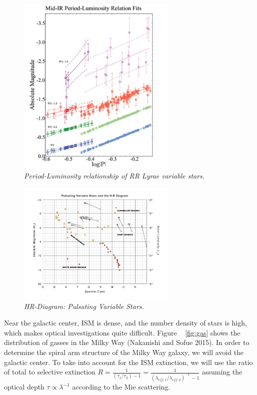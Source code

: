 \documentclass[letterpaper,11pt]{article}
\begin{document}
\begin{figure}[htb!]
  \begin{center}
\centerline{\includegraphics[width=3in]{figures/PL_relation}}
\caption{\it \small{Period-Luminosity relationship of RR Lyrae variable stars. \label{fig:plrelationrrlyrae}}}
  \end{center}
\end{figure}
\begin{figure}[htb!]
  \begin{center}
\centerline{\includegraphics[width=3in]{figures/var_star_HR.png}}
\caption{\it \small{HR-Diagram: Pulsating Variable Stars. \label{fig:var-star-hr}}}
  \end{center}
\end{figure}


Near the galactic center, ISM is dense, and the number density of stars is high, which makes optical investigations quite difficult. Figure ~ \ref{fig:gas} shows the distribution of gasses in the Milky Way (Nakanishi and Sofue 2015). In order to determine the spiral arm structure of the Milky Way galaxy, we will avoid the galactic center. To take into account for the ISM extinction, we will use the ratio of total to selective extinction $R = \frac{1}{(\tau_{1} / \tau_{2}) -1} = \frac{1}{(\lambda_{eff,1} / \lambda_{eff,2})^{-1} \, -1}$ assuming the optical depth $\tau \propto \lambda^{-1}$ according to the Mie scattering. 
\end{document}
